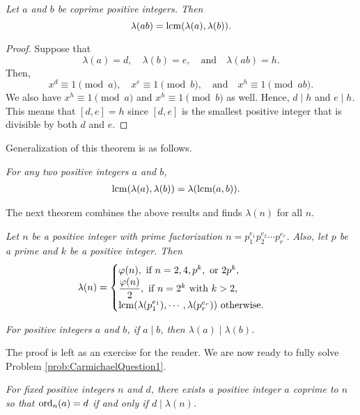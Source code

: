 \documentclass{subfile}
\begin{document}
	\begin{theorem}\slshape
		Let $a$ and $b$ be coprime positive integers. Then
		 \[\lambda(ab)=\operatorname{lcm}(\lambda(a),\lambda(b)).\]
	\end{theorem}
	
	\begin{proof}
		Suppose that $$\lambda(a)=d, \quad \lambda(b)=e, \quad \text{and} \quad \lambda(ab)=h.$$ Then, $$x^d\equiv1\pmod a, \quad x^e\equiv1\pmod b, \quad \text{and} \quad x^{h}\equiv1\pmod{ab}.$$ We also have $x^h\equiv1\pmod a$ and $x^h\equiv1\pmod b$ as well. Hence, $d \mid h$ and $e \mid h$. This means that $[d,e]=h$ since $[d,e]$ is the smallest positive integer that is divisible by both $d$ and $e$.
	\end{proof}
	Generalization of this theorem is as follows.
	\begin{theorem}\slshape
		For any two positive integers $a$ and $b$,
		\begin{align*}
		\operatorname{lcm}(\lambda(a),\lambda(b)) & = \lambda(\operatorname{lcm}(a,b)).
		\end{align*}
	\end{theorem}
	The next theorem combines the above results and finds $\lambda(n)$ for all $n$.
	\begin{theorem}\slshape\label{thm:CarmichaelFormula}
		Let $n$ be a positive integer with prime factorization $n=p_1^{e_1}p_2^{e_2}\cdots p_r^{e_r}$. Also, let $p$ be a prime and $k$ be a positive integer. Then
		\begin{align*}
			\lambda(n) & = 
			\begin{cases}
				\varphi(n),\mbox{ if } n = 2,4,p^k, \mbox{ or } 2p^k,\\
				\dfrac{\varphi(n)}{2},\mbox{ if }n=2^k\mbox{ with }k>2,\\
				\operatorname{lcm}(\lambda(p_1^{e_1}),\cdots,\lambda(p_r^{e_r})) \mbox{ otherwise.}
			\end{cases}
		\end{align*}
	\end{theorem}
	
	\begin{theorem}\slshape
		For positive integers $a$ and $b$, if $a \mid b$, then $\lambda(a) \mid \lambda(b)$.
	\end{theorem}
	The proof is left as an exercise for the reader. We are now ready to fully solve Problem \ref{prob:CarmichaelQuestion1}.
	\begin{theorem}\slshape
		For fixed positive integers $n$ and $d$, there exists a positive integer $a$  coprime to $n$ so that $\operatorname{ord}_n(a)=d$ if and only if $d \mid \lambda(n)$.
	\end{theorem}
	
\end{document}
